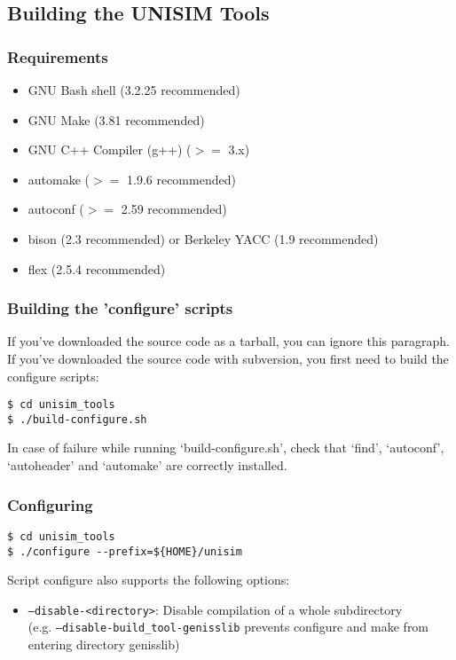 \subsection{Building the UNISIM Tools}

\subsubsection{Requirements}

\begin{itemize}
\item GNU Bash shell (3.2.25 recommended)
\item GNU Make (3.81 recommended)
\item GNU C++ Compiler (g++) ($>=$ 3.x)
\item automake ($>=$ 1.9.6 recommended)
\item autoconf ($>=$ 2.59 recommended)
\item bison (2.3 recommended) or Berkeley YACC (1.9 recommended)
\item flex (2.5.4 recommended)
\end{itemize}

\subsubsection{Building the 'configure' scripts}

If you've downloaded the source code as a tarball, you can ignore this paragraph.
If you've downloaded the source code with subversion, you first need to build the configure scripts:

\begin{verbatim}
$ cd unisim_tools
$ ./build-configure.sh
\end{verbatim}

In case of failure while running ‘build-configure.sh’, check that ‘find’, ‘autoconf’, ‘autoheader’ and ‘automake’ are correctly installed.

\subsubsection{Configuring}

\begin{verbatim}
$ cd unisim_tools
$ ./configure --prefix=${HOME}/unisim
\end{verbatim}

Script configure also supports the following options:

\begin{itemize}
\item \texttt{--disable-<directory>}: Disable compilation of a whole subdirectory\\
(e.g. \texttt{--disable-build\_tool-genisslib} prevents configure and make from entering directory genisslib)
\end{itemize}

